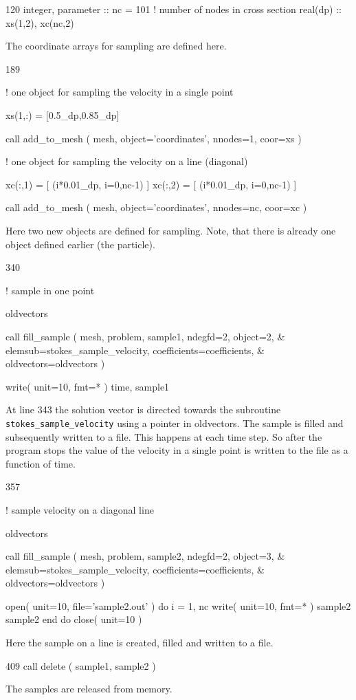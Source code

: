 \begin{listing}{120}
  integer, parameter :: nc = 101 ! number of nodes in cross section
  real(dp) :: xs(1,2), xc(nc,2)
                                                                                
\end{listing}
The coordinate arrays for sampling are defined here.
\begin{listing}{189}

! one object for sampling the velocity in a single point

  xs(1,:) = [0.5_dp,0.85_dp]

  call add_to_mesh ( mesh, object='coordinates', nnodes=1, coor=xs )

! one object for sampling the velocity on a line (diagonal)

  xc(:,1) = [ (i*0.01_dp, i=0,nc-1) ]
  xc(:,2) = [ (i*0.01_dp, i=0,nc-1) ]

  call add_to_mesh ( mesh, object='coordinates', nnodes=nc, coor=xc )

\end{listing}
Here two new objects are defined for sampling. Note, that there is already one
object defined earlier (the particle).
\begin{listing}{340}

!   sample in one point

    oldvectors%

    call fill_sample ( mesh, problem, sample1, ndegfd=2, object=2, &
      elemsub=stokes_sample_velocity, coefficients=coefficients, &
      oldvectors=oldvectors )

    write( unit=10, fmt=* ) time, sample1%

\end{listing}
At line 343 the solution vector is directed towards the subroutine
\texttt{stokes\_sample\_velocity} using a pointer in oldvectors.
The sample is filled and
subsequently written to a file. This happens at each time step. So after the
program stops the value of the velocity in a single point is written to the
file as a function of time.
\begin{listing}{357}

! sample velocity on a diagonal line

  oldvectors%

  call fill_sample ( mesh, problem, sample2, ndegfd=2, object=3, &
    elemsub=stokes_sample_velocity, coefficients=coefficients, &
      oldvectors=oldvectors )

  open( unit=10, file='sample2.out' )
  do i = 1, nc
    write( unit=10, fmt=* ) sample2%
                            sample2%
  end do
  close( unit=10 )

\end{listing}
Here the sample on a line is created, filled and written to a file.
\begin{listing}{409}
  call delete ( sample1, sample2 )   
\end{listing}
The samples are released from memory.

